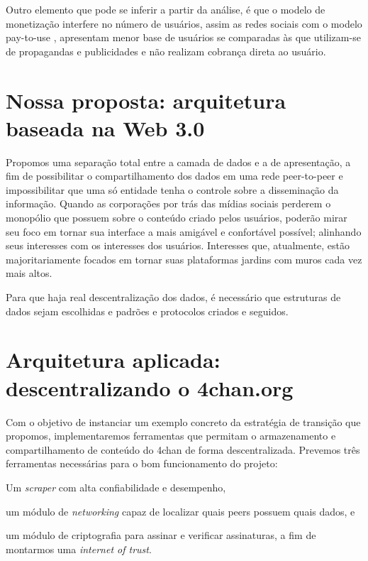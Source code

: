Outro elemento que pode se inferir a partir da análise, é que o modelo de monetização interfere no número de usuários, assim as redes sociais com o modelo pay-to-use , apresentam menor base de usuários se comparadas às que utilizam-se de propagandas e publicidades e não realizam cobrança direta ao usuário.



\chapter{Nossa proposta: arquitetura baseada na Web 3.0}

Propomos uma separação total entre a camada de dados e a de apresentação, a fim de possibilitar o compartilhamento dos dados em uma rede peer-to-peer e impossibilitar que uma só entidade tenha o controle sobre a disseminação da informação.
Quando as corporações por trás das mídias sociais perderem o monopólio que possuem sobre o conteúdo criado pelos usuários, poderão mirar seu foco em tornar sua interface a mais amigável e confortável possível; alinhando seus interesses com os interesses dos usuários.
Interesses que, atualmente, estão majoritariamente focados em tornar suas plataformas jardins com muros cada vez mais altos.



Para que haja real descentralização dos dados, é necessário que estruturas de dados sejam escolhidas e padrões e protocolos criados e seguidos.

\chapter{Arquitetura aplicada: descentralizando o 4chan.org}

Com o objetivo de instanciar um exemplo concreto da estratégia de transição que propomos, implementaremos ferramentas que permitam o armazenamento e compartilhamento de conteúdo do 4chan de forma descentralizada.
Prevemos três ferramentas necessárias para o bom funcionamento do projeto:
\begin{enumerate*}[label=(\arabic*)]
    \item Um \textit{scraper} com alta confiabilidade e desempenho,
    \item um módulo de \textit{networking} capaz de localizar quais peers possuem quais dados, e
    \item um módulo de criptografia para assinar e verificar assinaturas, a fim de montarmos uma \textit{internet of trust}. 
\end{enumerate*}

